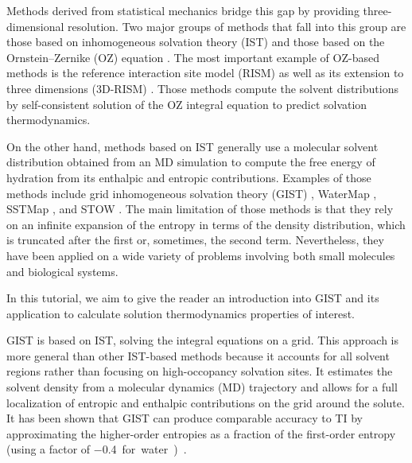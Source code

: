 \documentclass[9pt,tutorial]{livecoms}
\begin{document}
Methods derived from statistical mechanics bridge this gap by providing three-dimensional resolution.
Two major groups of methods that fall into this group are those based on inhomogeneous solvation theory (IST) \cite{Lazaridis1998} and those based on the Ornstein--Zernike (OZ) equation \cite{Hansen2013-simple-liquids}.
The most important example of OZ-based methods is the reference interaction site model (RISM) \cite{Chandler1972-rism} as well as its extension to three dimensions (3D-RISM) \cite{Kovalenko1998-3drism}.
Those methods compute the solvent distributions by self-consistent solution of the OZ integral equation to predict solvation thermodynamics.

On the other hand, methods based on IST generally use a molecular solvent distribution obtained from an MD simulation to compute the free energy of hydration from its enthalpic and entropic contributions.
Examples of those methods include grid inhomogeneous solvation theory (GIST) \cite{Nguyen2012,Ramsey2016}, WaterMap \cite{Young2007-watermap,Abel2008-watermap}, SSTMap \cite{Haider2018-sstmap}, and STOW \cite{Li2012-stow}.
The main limitation of those methods is that they rely on an infinite expansion of the entropy in terms of the density distribution, which is truncated after the first or, sometimes, the second \cite{Nguyen2016-gist-second-order,Waibl2022-gist-solvents} term.
Nevertheless, they have been applied on a wide variety of problems involving both small molecules and biological systems.

In this tutorial, we aim to give the reader an introduction into GIST and its application to calculate solution thermodynamics properties of interest. 

GIST is based on IST, solving the integral equations on a grid. 
This approach is more general than other IST-based methods because it accounts for all solvent regions rather than focusing on high-occopancy solvation sites.
It estimates the solvent density from a molecular dynamics (MD) trajectory and allows for a full localization of entropic and enthalpic contributions on the grid around the solute.
It has been shown that GIST can produce comparable accuracy to TI by approximating the higher-order entropies as a fraction of the first-order entropy (using a factor of \SI{-0.4} for water) \cite{Chen2021,Waibl2022-gist-solvents}.
\end{document}
